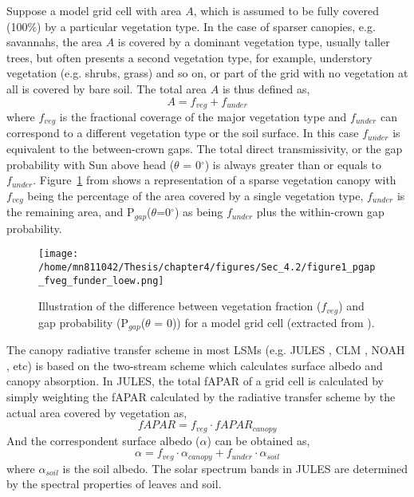 \documentclass[a4paper,11pt]{report}
\begin{document}
Suppose a model grid cell with area $A$, which is assumed to be fully covered (100\%) by a particular vegetation type. In the case of sparser canopies, e.g. savannahs, the area $A$ is covered by a dominant vegetation type, usually taller trees, but often presents a second vegetation type, for example, understory vegetation (e.g. shrubs, grass) and so on, or part of the grid with no vegetation at all is covered by bare soil. The total area $A$ is thus defined as,
\begin{equation}
A = f_{veg} + f_{under}
\label{equation:area}
\end{equation}
\noindent where $f_{veg}$ is the fractional coverage of the major vegetation type and $f_{under}$ can correspond to a different vegetation type or the soil surface.
In this case $f_{under}$ is equivalent to the between-crown gaps. The total direct transmissivity, or the gap probability with Sun above head ($\theta$ = 0$^{\circ}$) is always greater than or equals to $f_{under}$. Figure~\ref{f:loew2014} from \citet{loew2014} shows a representation of a sparse vegetation canopy with $f_{veg}$ being the percentage of the area covered by a single vegetation type, $f_{under}$ is the remaining area, and P$_{gap}$($\theta$=0$^{\circ}$) as being $f_{under}$ plus the within-crown gap probability.

\begin{figure}
\centering
\texttt{[image: /home/mn811042/Thesis/chapter4/figures/Sec\_4.2/figure1\_pgap\_fveg\_funder\_loew.png]}
\caption{Illustration of the difference between vegetation fraction ($f_{veg}$) and gap probability (P$_{gap}$($\theta$ = 0)) for a model grid cell (extracted from \citet{loew2014}).} 
\label{f:loew2014}
\end{figure}

The canopy radiative transfer scheme in most LSMs (e.g. JULES \citep{Clark2011}, CLM \citep{Bonan2002}, NOAH \citep{Niu2011}, etc)  is based on the two-stream scheme \citep{sellers1985} which calculates surface albedo and canopy absorption. In JULES, the total fAPAR of a grid cell is calculated by simply weighting the fAPAR calculated by the radiative transfer scheme by the actual area covered by vegetation as, 
\begin{equation}
fAPAR = f_{veg} \cdot fAPAR_{canopy}
\label{equation:faparvegfraction}
\end{equation}
And the correspondent surface albedo ($\alpha$) can be obtained as, 
\begin{equation}
\alpha = f_{veg} \cdot \alpha_{canopy}  +  f_{under} \cdot \alpha_{soil}
\label{equation:albedovegfraction}
\end{equation}
\noindent where $\alpha_{soil}$ is the soil albedo. The solar spectrum bands in JULES are determined by the spectral properties of leaves and soil.
\end{document}
